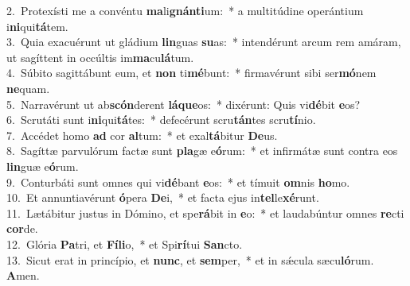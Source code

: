 {2.~}Protexísti me a convéntu \textbf{ma}li\textbf{gnán}\textbf{ti}um:~* a multitúdine operántium i\textbf{ni}qui\textbf{tá}tem.\\
{3.~}Quia exacuérunt ut gládium \textbf{lin}guas \textbf{su}as:~* intendérunt arcum rem amáram, ut sagíttent in occúltis im\textbf{ma}cu\textbf{lá}tum.\\
{4.~}Súbito sagittábunt eum, et \textbf{non} ti\textbf{mé}bunt:~* firmavérunt sibi ser\textbf{mó}nem \textbf{ne}quam.\\
{5.~}Narravérunt ut ab\textbf{scón}derent \textbf{lá}\textbf{que}os:~* dixérunt: Quis vi\textbf{dé}bit \textbf{e}os?\\
{6.~}Scrutáti sunt i\textbf{ni}qui\textbf{tá}tes:~* defecérunt scru\textbf{tán}tes scru\textbf{tí}nio.\\
{7.~}Accédet homo \textbf{ad} cor \textbf{al}tum:~* et exal\textbf{tá}bitur \textbf{De}us.\\
{8.~}Sagíttæ parvulórum factæ sunt \textbf{pla}gæ e\textbf{ó}rum:~* et infirmátæ sunt contra eos \textbf{lin}guæ e\textbf{ó}rum.\\
{9.~}Conturbáti sunt omnes qui vi\textbf{dé}bant \textbf{e}os:~* et tímuit \textbf{om}nis \textbf{ho}mo.\\
{10.~}Et annuntiavérunt \textbf{ó}pera \textbf{De}i,~* et facta ejus in\textbf{tel}le\textbf{xé}runt.\\
{11.~}Lætábitur justus in Dómino, et spe\textbf{rá}bit in \textbf{e}o:~* et laudabúntur omnes \textbf{re}cti \textbf{cor}de.\\
{12.~}Glória \textbf{Pa}tri, et \textbf{Fí}\textbf{li}o,~* et Spi\textbf{rí}tui \textbf{San}cto.\\
{13.~}Sicut erat in princípio, et \textbf{nunc}, et \textbf{sem}per,~* et in sǽcula sæcu\textbf{ló}rum. \textbf{A}men.\\
